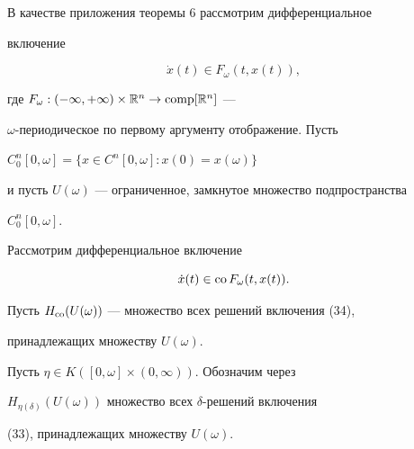 В качестве приложения теоремы 6 рассмотрим дифференциальное


включение


\begin{equation}


\Dot x(t)\in F_{\omega}(t,x(t)),


\end{equation}


где $F_\omega:(-\infty,+\infty)\times\Bbb R^n\to\operatorname{comp}[\Bbb R^n]$ ---


$\omega$-периодическое по первому аргументу отображение. Пусть


$C^n_0[0,\omega]=\{x\in C^n[0,\omega]:x(0)=x(\omega)\}$


и пусть $U(\omega)$ --- ограниченное, замкнутое множество подпространства


$C^n_0[0,\omega]$.





Рассмотрим дифференциальное включение


\begin{equation}


\Dot x(t)\in\co F_{\omega}(t,x(t)).


\end{equation}


Пусть $H_{\operatorname{co}}(U(\omega))$ --- множество всех решений включения (34),


принадлежащих множеству $U(\omega)$.


Пусть $\eta\in K([0,\omega]\times(0,\infty))$. Обозначим через


$H_{\eta(\delta)}(U(\omega))$ множество всех $\delta$-решений включения


(33), принадлежащих множеству $U(\omega)$.





